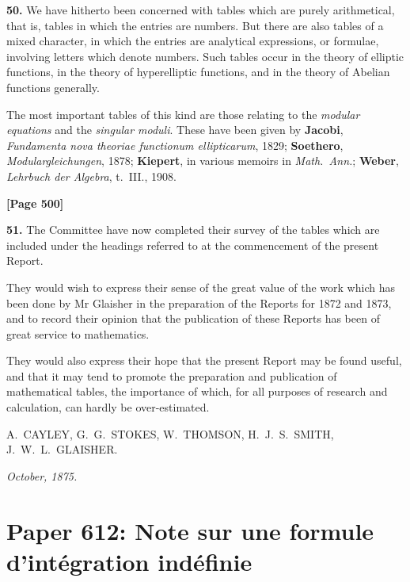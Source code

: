 \documentclass[11pt,a4paper]{article}
\begin{document}
\textbf{50.} We have hitherto been concerned with tables which are purely arithmetical,
that is, tables in which the entries are numbers. But there are also tables of a mixed
character, in which the entries are analytical expressions, or formulae, involving letters
which denote numbers. Such tables occur in the theory of elliptic functions, in the
theory of hyperelliptic functions, and in the theory of Abelian functions generally.

The most important tables of this kind are those relating to the \textit{modular equations}
and the \textit{singular moduli}. These have been given by
\quad\textbf{Jacobi}, \textit{Fundamenta nova theoriae functionum ellipticarum}, 1829;
\quad\textbf{Soethero}, \textit{Modulargleichungen}, 1878;
\quad\textbf{Kiepert}, in various memoirs in \textit{Math.\ Ann.};
\quad\textbf{Weber}, \textit{Lehrbuch der Algebra}, t.\ III., 1908.

\newpage
\textbf{[Page 500]}

\textbf{51.} The Committee have now completed their survey of the tables which are
included under the headings referred to at the commencement of the present Report.

They would wish to express their sense of the great value of the work which has
been done by Mr Glaisher in the preparation of the Reports for 1872 and 1873,
and to record their opinion that the publication of these Reports has been of great
service to mathematics.

They would also express their hope that the present Report may be found useful,
and that it may tend to promote the preparation and publication of mathematical
tables, the importance of which, for all purposes of research and calculation, can
hardly be over-estimated.

\vspace{1em}
\begin{flushright}
A.\ CAYLEY,
G.\ G.\ STOKES,
W.\ THOMSON,
H.\ J.\ S.\ SMITH,
J.\ W.\ L.\ GLAISHER.
\end{flushright}

\textit{October, 1875.}


\newpage
\section{Paper 612: Note sur une formule d'int\' egration ind\' efinie}
\end{document}
